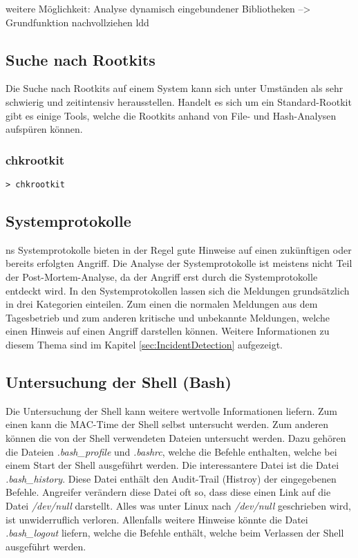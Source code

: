 weitere Möglichkeit: Analyse dynamisch eingebundener Bibliotheken --> Grundfunktion nachvollziehen
ldd



\subsection{Suche nach Rootkits}
Die Suche nach Rootkits auf einem System kann sich unter Umständen als sehr schwierig und zeitintensiv herausstellen. Handelt es sich um ein Standard-Rootkit gibt es einige Tools, welche die Rootkits anhand von File- und Hash-Analysen aufspüren können. 


\subsubsection{chkrootkit} 
\begin{lstlisting}
> chkrootkit
\end{lstlisting}



\subsection{Systemprotokolle}ns
Systemprotokolle bieten in der Regel gute Hinweise auf einen zukünftigen oder bereits erfolgten Angriff. Die Analyse der Systemprotokolle ist meistens nicht Teil der Post-Mortem-Analyse, da der Angriff erst durch die Systemprotokolle entdeckt wird. In den Systemprotokollen lassen sich die Meldungen grundsätzlich in drei Kategorien einteilen. Zum einen die normalen Meldungen aus dem Tagesbetrieb und zum anderen kritische und unbekannte Meldungen, welche einen Hinweis auf einen Angriff darstellen können. Weitere Informationen zu diesem Thema sind im Kapitel \ref{sec:IncidentDetection}  aufgezeigt.



\subsection{Untersuchung der Shell (Bash)}
Die Untersuchung der Shell kann weitere wertvolle Informationen liefern. Zum einen kann die MAC-Time der Shell selbst untersucht werden. Zum anderen können die von der Shell verwendeten Dateien untersucht werden. Dazu gehören die Dateien \textit{.bash\_profile} und \textit{.bashrc}, welche die Befehle enthalten, welche bei einem Start der Shell ausgeführt werden. Die interessantere Datei ist die Datei \textit{.bash\_history}. Diese Datei enthält den Audit-Trail (Histroy) der eingegebenen Befehle. Angreifer verändern diese Datei oft so, dass diese einen Link auf die Datei \textit{/dev/null} darstellt. Alles was unter Linux nach \textit{/dev/null} geschrieben wird, ist unwiderruflich verloren. Allenfalls weitere Hinweise könnte die Datei \textit{.bash\_logout} liefern, welche die Befehle enthält, welche beim Verlassen der Shell ausgeführt werden.

